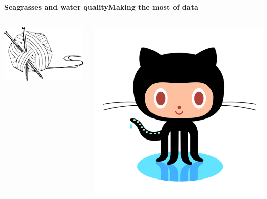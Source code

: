 \documentclass[serif]{beamer}\usepackage[]{graphicx}\usepackage[]{color}
\begin{document}
\begin{frame}{\textbf{Seagrasses and water quality}}{\textbf{Making the most of data}}
\begin{columns}
\begin{column}{0.2\textwidth}
\centerline{\includegraphics[width = \textwidth]{fig/knit-logo.png}}
\end{column}
\begin{column}{0.2\textwidth}
\centerline{\includegraphics[width = \textwidth]{fig/octocat.png}}
\end{column}
\end{columns}
\end{frame}
\end{document}
